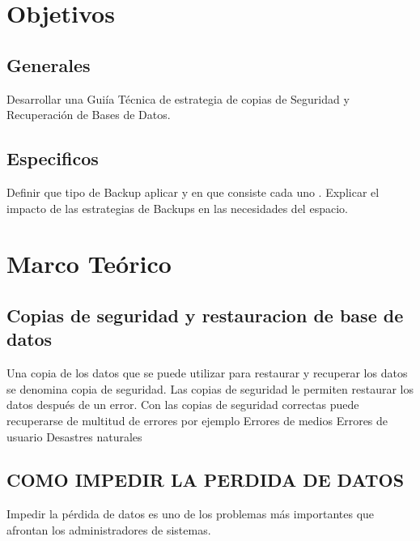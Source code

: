\documentclass[a4paper,twocolumn,10pt]{article}
\begin{document}
\section{Objetivos}

    \subsection{Generales}
       \normalsize Desarrollar una Gui\'ia T\'ecnica de estrategia de copias de Seguridad y Recuperaci\'on de Bases de Datos.
    \subsection{Especificos}
       \normalsize Definir que tipo de Backup aplicar y en que consiste cada uno . Explicar el impacto de las estrategias de Backups en las necesidades del espacio.

\section{Marco Te\'orico}
	 \subsection{Copias de seguridad y restauracion de base de datos}
\normalsize Una copia de los datos que se puede utilizar para restaurar y recuperar los datos se denomina copia de seguridad. Las copias de seguridad le permiten restaurar los datos despu\'es de un error. Con las copias de seguridad correctas puede recuperarse de multitud de errores por ejemplo
		\normalsize Errores de medios
		\normalsize Errores de usuario
		\normalsize Desastres naturales

	 \subsection{COMO IMPEDIR LA PERDIDA DE DATOS}
\normalsize Impedir la p\'erdida de datos es uno de los problemas m\'as importantes que afrontan los administradores de sistemas.\\
\end{document}
